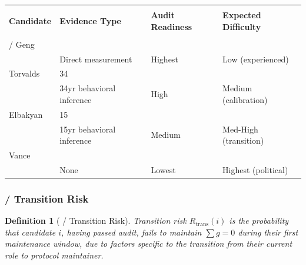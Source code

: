 \documentclass[12pt,a4paper]{article}
\newtheorem{definition}[theorem]{Definition}
\theoremstyle{remark}
\begin{document}
\begin{center}
\begin{longtable}{p{} p{} p{} p{}}
\toprule
\textbf{} & \textbf{} & \textbf{} & \textbf{} \\
\textbf{Candidate} & \textbf{Evidence Type} & \textbf{Audit Readiness} & \textbf{Expected Difficulty} \\
\midrule
\endfirsthead
\toprule
\textbf{} & \textbf{} & \textbf{} & \textbf{} \\
\midrule
\endhead
\bottomrule
\endfoot
\midrule
 / Geng &  &  &  \\
& Direct measurement & Highest & Low (experienced) \\
\midrule
Torvalds & 34 &  &  \\
& 34yr behavioral inference & High & Medium (calibration) \\
\midrule
Elbakyan & 15 &  &  \\
& 15yr behavioral inference & Medium & Med-High (transition) \\
\midrule
Vance &  &  &  \\
& None & Lowest & Highest (political) \\
\bottomrule
\end{longtable}
\end{center}

\subsubsection{ / Transition Risk}

\begin{definition}[ / Transition Risk]
Transition risk $R_{\text{trans}}(i)$ is the probability that candidate $i$,
having passed audit, fails to maintain $\sum g = 0$ during their first
maintenance window, due to factors specific to the transition from their
current role to protocol maintainer.
\end{definition}
\end{document}
